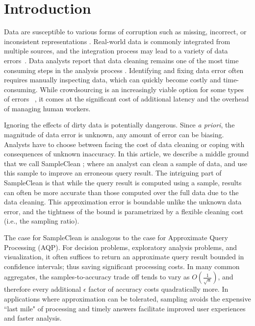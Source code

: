 \section{Introduction}
Data are susceptible to various forms of corruption such as missing,
incorrect, or inconsistent representations \cite{Gartner}.
Real-world data is commonly integrated from multiple sources, and the integration process may lead to a variety of data errors~\cite{DBLP:journals/pvldb/DongS13}. 
Data analysts report that data cleaning remains one of the most time
consuming steps in the analysis process \cite{nytimes}.
Identifying and fixing data error often requires manually inspecting data, which can quickly become costly and time-consuming. 
While crowdsourcing is an increasingly viable option for some types of errors ~\cite{DBLP:conf/sigmod/JefferyFH08,DBLP:journals/pvldb/FanLMTY10,DBLP:journals/pvldb/YakoutENOI11, gokhale2014corleone, park2014crowdfill, sampleclean,chu2015katara}, it comes at the significant cost of additional latency and the overhead of managing human workers. 

Ignoring the effects of dirty data is potentially dangerous.
Since \emph{a priori}, the magnitude of data error is unknown, any amount of error can be biasing.
Analysts have to choose between facing the cost of data cleaning
or coping with consequences of unknown inaccuracy.
In this article, we describe a middle ground that we call SampleClean \cite{wang1999sample, krishnan2015svc}; where an analyst can clean a sample of data, and use this sample to improve an erroneous query result.
The intriguing part of SampleClean is that while the query result is computed using a sample,
results can often be more accurate than those computed over the full data due to the data cleaning.
This approximation error is boundable unlike the unknown data error, and the tightness of the bound is parametrized by a flexible cleaning cost (i.e., the sampling ratio).

The case for SampleClean is analogous to the case for Approximate Query Processing \cite{DBLP:conf/icde/OlkenR92, olken1993random, garofalakis2001approximate, AgarwalMPMMS13} (AQP).
For decision problems, exploratory analysis problems, and visualization, it often suffices to return an approximate query result bounded in confidence intervals; thus saving significant processing costs.
In many common aggregates, the samples-to-accuracy trade off tends to vary as $O(\frac{1}{\sqrt{n}})$, and therefore every additional $\epsilon$ factor of accuracy costs quadratically more. 
In applications where approximation can be tolerated, sampling avoids the expensive ``last mile" of processing and timely answers facilitate improved user experiences and faster analysis.

